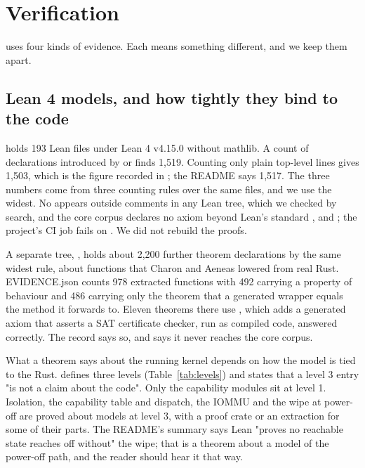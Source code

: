 \section{Verification}\label{sec:verify}

\nonos{} uses four kinds of evidence. Each means something different, and we keep them apart.

\subsection{Lean 4 models, and how tightly they bind to the code}

 holds 193 Lean files under Lean 4 \cite{lean4} v4.15.0 without mathlib. A count of declarations introduced by  or  finds 1,519. Counting only plain top-level  lines gives 1,503, which is the figure recorded in ; the README says 1,517. The three numbers come from three counting rules over the same files, and we use the widest. No  appears outside comments in any Lean tree, which we checked by search, and the core corpus declares no axiom beyond Lean's standard ,  and ; the project's CI job fails on . We did not rebuild the proofs.

A separate tree, , holds about 2,200 further theorem declarations by the same widest rule, about functions that Charon and Aeneas \cite{aeneas} lowered from real Rust. EVIDENCE.json counts 978 extracted functions with 492 carrying a property of behaviour and 486 carrying only the theorem that a generated wrapper equals the method it forwards to. Eleven theorems there use , which adds a generated axiom that asserts a SAT certificate checker, run as compiled code, answered correctly. The record says so, and says it never reaches the core corpus.

What a theorem says about the running kernel depends on how the model is tied to the Rust.  defines three levels (Table~\ref{tab:levels}) and states that a level 3 entry "is not a claim about the code". Only the capability modules sit at level 1. Isolation, the capability table and dispatch, the IOMMU and the wipe at power-off are proved about models at level 3, with a proof crate or an extraction for some of their parts. The README's summary says Lean "proves no reachable state reaches off without" the wipe; that is a theorem about a model of the power-off path, and the reader should hear it that way.

